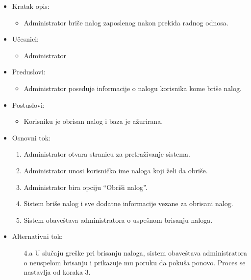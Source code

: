 
\begin{itemize}
    \item Kratak opis:
        \begin{itemize}
            \item Administrator briše nalog zaposlenog nakon prekida radnog odnosa.
        \end{itemize}
    \item Učesnici:
        \begin{itemize}
            \item Administrator
        \end{itemize}
    \item Preduslovi:
        \begin{itemize}
            \item Administrator poseduje informacije o nalogu korisnika kome briše nalog.
        \end{itemize}
    \item Postuslovi:
        \begin{itemize}
            \item Korisniku je obrisan nalog i baza je ažurirana.
        \end{itemize}
    \item Osnovni tok:
        \begin{enumerate}
         \item Administrator otvara stranicu za pretraživanje sistema.
         \item Administrator unosi korisničko ime naloga koji želi da obriše.
         \item Administrator bira opciju ``Obriši nalog''.
         \item Sistem briše nalog i sve dodatne informacije vezane za obrisani nalog.
         \item Sistem obaveštava administratora o uspešnom brisanju naloga.
        \end{enumerate}
    \item Alternativni tok:
        \begin{itemize}
            \item[4.a] U slučaju greške pri brisanju naloga, sistem obaveštava administratora o neuspelom brisanju i prikazuje mu poruku da pokuša ponovo. Proces se nastavlja od koraka 3.
        \end{itemize}
\end{itemize}

